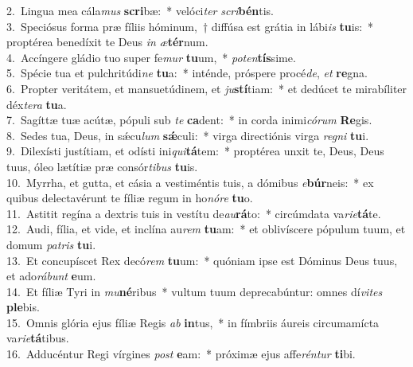 {2.~}Lingua mea cála\textit{mus} \textbf{scri}bæ:~* velóci\textit{ter} \textit{scri}\textbf{bén}tis.\\
{3.~}Speciósus forma præ fíliis hóminum,~† diffúsa est grátia in lábi\textit{is} \textbf{tu}is:~* proptérea benedíxit te Deus \textit{in} \textit{æ}\textbf{tér}num.\\
{4.~}Accíngere gládio tuo super fe\textit{mur} \textbf{tu}um,~* \textit{po}\textit{ten}\textbf{tís}sime.\\
{5.~}Spécie tua et pulchritúdi\textit{ne} \textbf{tu}a:~* inténde, próspere procé\textit{de}, \textit{et} \textbf{re}gna.\\
{6.~}Propter veritátem, et mansuetúdinem, et \textit{ju}\textbf{stí}tiam:~* et dedúcet te mirabíliter déx\textit{te}\textit{ra} \textbf{tu}a.\\
{7.~}Sagíttæ tuæ acútæ, pópuli sub \textit{te} \textbf{ca}dent:~* in corda inimi\textit{có}\textit{rum} \textbf{Re}gis.\\
{8.~}Sedes tua, Deus, in sǽcu\textit{lum} \textbf{sǽ}culi:~* virga directiónis virga \textit{re}\textit{gni} \textbf{tu}i.\\
{9.~}Dilexísti justítiam, et odísti ini\textit{qui}\textbf{tá}tem:~* proptérea unxit te, Deus, Deus tuus, óleo lætítiæ præ consór\textit{ti}\textit{bus} \textbf{tu}is.\\
{10.~}Myrrha, et gutta, et cásia a vestiméntis tuis, a dómibus \textit{e}\textbf{búr}neis:~* ex quibus delectavérunt te fíliæ regum in ho\textit{nó}\textit{re} \textbf{tu}o.\\
{11.~}Astitit regína a dextris tuis in vestítu de\textit{au}\textbf{rá}to:~* circúmdata va\textit{ri}\textit{e}\textbf{tá}te.\\
{12.~}Audi, fília, et vide, et inclína au\textit{rem} \textbf{tu}am:~* et oblivíscere pópulum tuum, et domum \textit{pa}\textit{tris} \textbf{tu}i.\\
{13.~}Et concupíscet Rex decó\textit{rem} \textbf{tu}um:~* quóniam ipse est Dóminus Deus tuus, et ado\textit{rá}\textit{bunt} \textbf{e}um.\\
{14.~}Et fíliæ Tyri in \textit{mu}\textbf{né}ribus~* vultum tuum deprecabúntur: omnes dí\textit{vi}\textit{tes} \textbf{ple}bis.\\
{15.~}Omnis glória ejus fíliæ Regis \textit{ab} \textbf{in}tus,~* in fímbriis áureis circumamícta va\textit{ri}\textit{e}\textbf{tá}tibus.\\
{16.~}Adducéntur Regi vírgines \textit{post} \textbf{e}am:~* próximæ ejus affe\textit{rén}\textit{tur} \textbf{ti}bi.\\
